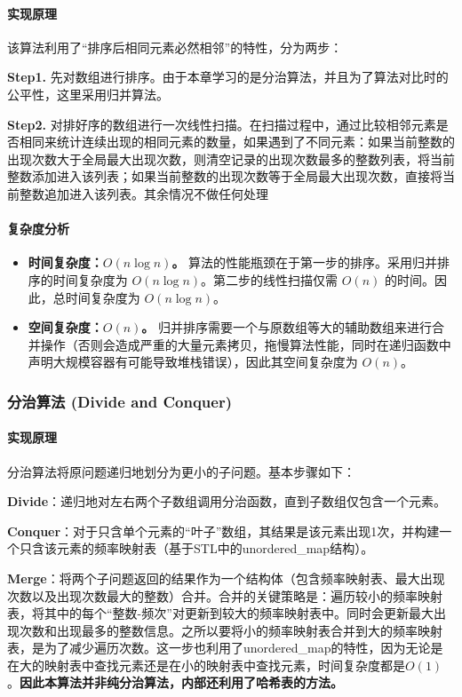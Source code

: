 \documentclass[UTF8,12pt,a4paper]{ctexart}
\begin{document}
\paragraph{实现原理}
该算法利用了“排序后相同元素必然相邻”的特性，分为两步：

\textbf{Step1.} 先对数组进行排序。由于本章学习的是分治算法，并且为了算法对比时的公平性，这里采用归并算法。

\textbf{Step2.} 对排好序的数组进行一次线性扫描。在扫描过程中，通过比较相邻元素是否相同来统计连续出现的相同元素的数量，如果遇到了不同元素：如果当前整数的出现次数大于全局最大出现次数，则清空记录的出现次数最多的整数列表，将当前整数添加进入该列表；如果当前整数的出现次数等于全局最大出现次数，直接将当前整数追加进入该列表。其余情况不做任何处理

\paragraph{复杂度分析}
\begin{itemize}
    \item \textbf{时间复杂度：$O(n\log n)$。} 算法的性能瓶颈在于第一步的排序。采用归并排序的时间复杂度为 $O(n\log n)$。第二步的线性扫描仅需 $O(n)$ 的时间。因此，总时间复杂度为 $O(n\log n)$。
    \item \textbf{空间复杂度：$O(n)$。} 归并排序需要一个与原数组等大的辅助数组来进行合并操作（否则会造成严重的大量元素拷贝，拖慢算法性能，同时在递归函数中声明大规模容器有可能导致堆栈错误），因此其空间复杂度为 $O(n)$。
\end{itemize}

\subsubsection{分治算法 (Divide and Conquer)}
\paragraph{实现原理}
分治算法将原问题递归地划分为更小的子问题。基本步骤如下：

\textbf{Divide}：递归地对左右两个子数组调用分治函数，直到子数组仅包含一个元素。

\textbf{Conquer}：对于只含单个元素的“叶子”数组，其结果是该元素出现1次，并构建一个只含该元素的频率映射表（基于STL中的unordered\_map结构）。

\textbf{Merge}：将两个子问题返回的结果作为一个结构体（包含频率映射表、最大出现次数以及出现次数最大的整数）合并。合并的关键策略是：遍历较小的频率映射表，将其中的每个“整数-频次”对更新到较大的频率映射表中。同时会更新最大出现次数和出现最多的整数信息。之所以要将小的频率映射表合并到大的频率映射表，是为了减少遍历次数。这一步也利用了unordered\_map的特性，因为无论是在大的映射表中查找元素还是在小的映射表中查找元素，时间复杂度都是$O(1)$。\textbf{因此本算法并非纯分治算法，内部还利用了哈希表的方法。}
\end{document}
